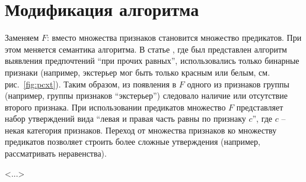 \chapter{Модификация алгоритма}
\label{chapter:modification}

Заменяем $F$: вместо множества признаков становится множество предикатов. При этом меняется семантика алгоритма. В статье \cite{Obiedkov:2013}, где был представлен алгоритм выявления предпочтений \enquote{при прочих равных}, использовались только бинарные признаки (например, экстерьер мог быть только красным или белым, см. рис.~\ref{fig:pcxt}). Таким образом, из появления в $F$ одного из признаков группы (например, группы признаков ``экстерьер'') следовало наличие или отсутствие второго признака. При использовании предикатов множество $F$ представляет набор утверждений вида ``левая и правая часть равны по признаку $c$'', где $c$ – некая категория признаков. Переход от множества признаков ко множеству предикатов позволяет строить более сложные утверждения (например, рассматривать неравенства).

<...> 